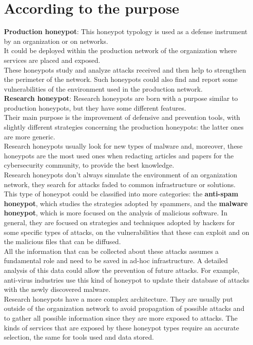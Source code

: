\section{According to the purpose}
\textbf{Production honeypot}:
This honeypot typology is used as a defense instrument by an organization or on networks.\\
It could be deployed within the production network of the organization where services are placed and exposed.\\
These honeypots study and analyze attacks received and then help to strengthen the perimeter of the network. Such honeypots could also find and report some vulnerabilities of the environment used in the production network. \\
\textbf{Research honeypot}:
Research honeypots are born with a purpose similar to production honeypots, but they have some different features.\\
Their main purpose is the improvement of defensive and prevention tools, with slightly different strategies concerning the production honeypots: the latter ones are more generic.\\
Research honeypots usually look for new types of malware and, moreover, these honeypots are the most used ones when redacting articles and papers for the cybersecurity community, to provide the best knowledge.\\
Research honeypots don't always simulate the environment of an organization network, they search for attacks faded to common infrastructure or solutions.\\
This type of honeypot could be classified into more categories: the \textbf{anti-spam honeypot}, which studies the strategies adopted by spammers, and the \textbf{malware honeypot}, which is more focused on the analysis of malicious software. In general, they are focused on strategies and techniques adopted by hackers for some specific types of attacks, on the vulnerabilities that these can exploit and on the malicious files that can be diffused.\\
All the information that can be collected about these attacks assumes a fundamental role and need to be saved in ad-hoc infrastructure. A detailed analysis of this data could allow the prevention of future attacks. For example, anti-virus industries use this kind of honeypot to update their database of attacks with the newly discovered malware.\\
Research honeypots have a more complex architecture. They are usually put outside of the organization network to avoid propagation of possible attacks and to gather all possible information since they are more exposed to attacks. The kinds of services that are exposed by these honeypot types require an accurate selection, the same for tools used and data stored.
